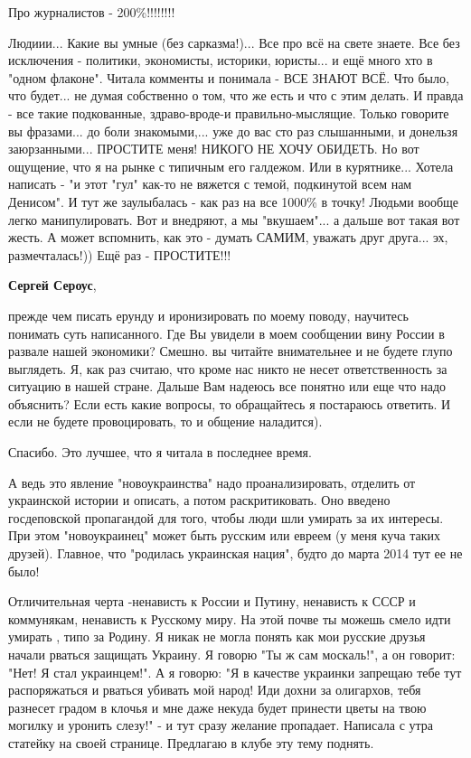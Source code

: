 \begin{itemize}
Про журналистов - 200\%!!!!!!!!


Людиии... Какие вы умные (без сарказма!)... Все про всё на свете знаете. Все
без исключения - политики, экономисты, историки, юристы... и ещё много хто в
"одном флаконе". Читала комменты и понимала - ВСЕ ЗНАЮТ ВСЁ. Что было, что
будет... не думая собственно о том, что же есть и что с этим делать. И правда -
все такие подкованные, здраво-вроде-и правильно-мыслящие. Только говорите вы
фразами... до боли знакомыми,... уже до вас сто раз слышанными, и донельзя
заюрзанными... ПРОСТИТЕ меня! НИКОГО НЕ ХОЧУ ОБИДЕТЬ. Но вот ощущение, что я на
рынке с типичным его галдежом. Или в курятнике... Хотела написать - "и этот
"гул" как-то не вяжется с темой, подкинутой всем нам Денисом". И тут же
заулыбалась - как раз на все 1000\% в точку! Людьми вообще легко
манипулировать.  Вот и внедряют, а мы "вкушаем"... а дальше вот такая вот
жесть. А может вспомнить, как это - думать САМИМ, уважать друг друга... эх,
размечталась!)) Ещё раз - ПРОСТИТЕ!!!

\textbf{Сергей Сероус}, 

прежде чем писать ерунду и иронизировать по моему поводу, научитесь понимать
суть написанного. Где Вы увидели в моем сообщении вину России в развале нашей
экономики? Смешно. вы читайте внимательнее и не будете глупо выглядеть. Я, как
раз считаю, что кроме нас никто не несет ответственность за ситуацию в нашей
стране. Дальше Вам надеюсь все понятно или еще что надо объяснить? Если есть
какие вопросы, то обращайтесь я постараюсь ответить. И если не будете
провоцировать, то и общение наладится).

Спасибо. Это лучшее, что я читала в последнее время.


А ведь это явление "новоукраинства" надо проанализировать, отделить от
украинской истории и описать, а потом раскритиковать. Оно введено госдеповской
пропагандой для того, чтобы люди шли умирать за их интересы. При этом
"новоукраинец" может быть русским или евреем (у меня куча таких друзей).
Главное, что "родилась украинская нация", будто до марта 2014 тут ее не было!

Отличительная черта -ненависть к России и Путину, ненависть к СССР и
коммунякам, ненависть к Русскому миру. На этой почве ты можешь смело идти
умирать , типо за Родину. Я никак не могла понять как мои русские друзья начали
рваться защищать Украину. Я говорю "Ты ж сам москаль!", а он говорит: "Нет! Я
стал украинцем!". А я говорю: "Я в качестве украинки запрещаю тебе тут
распоряжаться и рваться убивать мой народ! Иди дохни за олигархов, тебя
разнесет градом в клочья и мне даже некуда будет принести цветы на твою могилку
и уронить слезу!" - и тут сразу желание пропадает. Написала с утра статейку на
своей странице. Предлагаю в клубе эту тему поднять.


\end{itemize}
